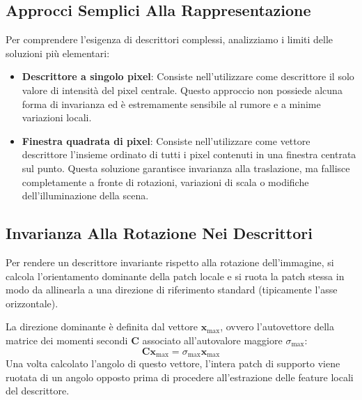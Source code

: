 ﻿\documentclass[11pt, a4paper]{article}
\begin{document}
\subsection{Approcci Semplici Alla Rappresentazione}

Per comprendere l'esigenza di descrittori complessi, analizziamo i limiti delle soluzioni più elementari:


\begin{itemize}
    \item \textbf{Descrittore a singolo pixel}: Consiste nell'utilizzare come descrittore il solo valore di intensità del pixel centrale. Questo approccio non possiede alcuna forma di invarianza ed è estremamente sensibile al rumore e a minime variazioni locali.
    \item \textbf{Finestra quadrata di pixel}: Consiste nell'utilizzare come vettore descrittore l'insieme ordinato di tutti i pixel contenuti in una finestra centrata sul punto. Questa soluzione garantisce invarianza alla traslazione, ma fallisce completamente a fronte di rotazioni, variazioni di scala o modifiche dell'illuminazione della scena.
\end{itemize}

\subsection{Invarianza Alla Rotazione Nei Descrittori}

Per rendere un descrittore invariante rispetto alla rotazione dell'immagine, si calcola l'orientamento dominante della patch locale e si ruota la patch stessa in modo da allinearla a una direzione di riferimento standard (tipicamente l'asse orizzontale).


La direzione dominante è definita dal vettore $\bm{x}_{\max}$, ovvero l'autovettore della matrice dei momenti secondi $\bm{C}$ associato all'autovalore maggiore $\sigma_{\max}$:
\[ \bm{C} \bm{x}_{\max} = \sigma_{\max} \bm{x}_{\max} \]
Una volta calcolato l'angolo di questo vettore, l'intera patch di supporto viene ruotata di un angolo opposto prima di procedere all'estrazione delle feature locali del descrittore.
\end{document}
